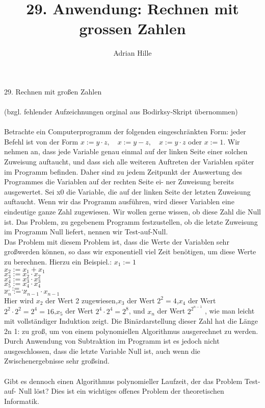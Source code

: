 \documentclass{scrartcl}
\title{29. Anwendung: Rechnen mit grossen Zahlen}
\author{Adrian Hille}
\begin{document}
\Large 29. Rechnen mit gro\ss en Zahlen\\
\\
\normalsize
(bzgl. fehlender Aufzeichnungen orginal aus Bodirksy-Skript \"ubernommen)\\\\
Betrachte ein Computerprogramm der folgenden eingeschr\"ankten Form: jeder Befehl ist von der Form $ x := y \cdot z, \quad x := y-z, \quad x := y \cdot z$ oder $x := 1$.
Wir nehmen an, dass jede Variable genau einmal auf der linken Seite einer solchen Zuweisung auftaucht, und dass sich alle weiteren Auftreten der Variablen sp\"ater im Programm befinden. Daher sind zu jedem Zeitpunkt der Auswertung des Programmes die Variablen auf der rechten Seite ei- ner Zuweisung bereits ausgewertet. Sei x0 die Variable, die auf der linken Seite der letzten Zuweisung auftaucht. Wenn wir das Programm ausf\"uhren, wird dieser Variablen eine eindeutige ganze Zahl zugewiesen. Wir wollen gerne wissen, ob diese Zahl die Null ist. Das Problem, zu gegebenem Programm festzustellen, ob die letzte Zuweisung im Programm Null liefert, nennen wir Test-auf-Null.\\
Das Problem mit diesem Problem ist, dass die Werte der Variablen sehr gro\ss werden k\"onnen, so dass wir exponentiell viel Zeit ben\"otigen, um diese Werte zu berechnen. Hierzu ein Beispiel.:
$x_1 := 1$\\
$x_2 := x_1 + x_1$\\
$x_3 := x_2 \cdot x_2$\\
$x_4 := x_3 \cdot x_3$\\
$x_5 := x_4 \cdot x_4$\\
$... := ...$\\
$x_n := x_{n-1} \cdot x_{n-1}$\\
Hier wird $x_2$ der Wert 2 zugewiesen,$x_3$ der Wert $2^2 = 4$,$x_4$ der Wert $2^2\cdot 2^2 = 2^4 = 16$,$ x_5$ der Wert $2^4 \cdot 2^4 = 2^8$, und $x_n$ der Wert $2^{2^{n-1}}$ , wie man leicht mit vollst\"andiger Induktion zeigt. Die Bin\"ardarstellung dieser Zahl hat die L\"ange 2n 1: zu gro\ss, um von einem polynomiellen Algorithmus ausgerechnet zu werden. Durch Anwendung von Subtraktion im Programm ist es jedoch nicht ausgeschlossen, dass die letzte Variable Null ist, auch wenn die Zwischenergebnisse sehr gro\ss sind.\\\\
Gibt es dennoch einen Algorithmus polynomieller Laufzeit, der das Problem Test-auf- Null l\"ost? Dies ist ein wichtiges offenes Problem der theoretischen Informatik.\\
\end{document}
